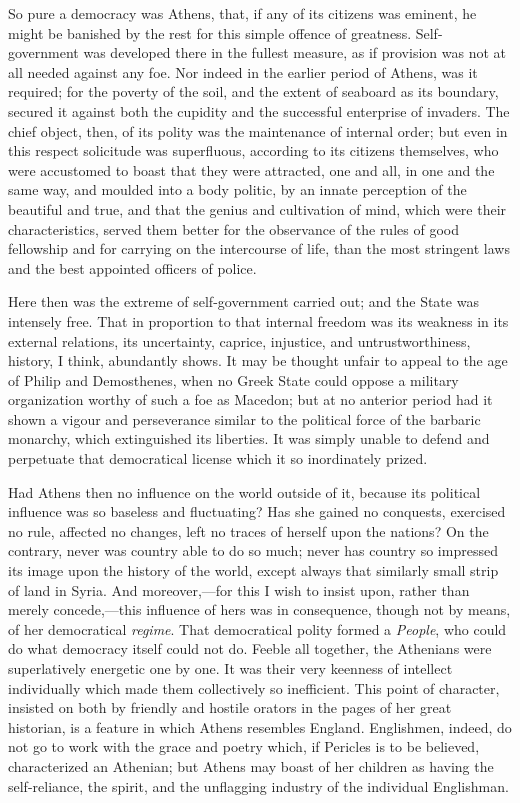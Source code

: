 So pure a democracy was Athens, that, if any of
its citizens was eminent, he might be banished by the rest for this
simple offence of greatness. Self-government was developed there in
the fullest measure, as if provision was not at all needed
against any foe. Nor indeed in the earlier period of Athens, was it
required; for the poverty of the soil, and the extent of seaboard as
its boundary, secured it against both the cupidity and the successful
enterprise of invaders. The chief object, then, of its polity was the
maintenance of internal order; but even in this respect solicitude was
superfluous, according to its citizens themselves, who were accustomed
to boast that they were attracted, one and all, in one and the same
way, and moulded into a body politic, by an innate perception of the
beautiful and true, and that the genius and cultivation of mind, which
were their characteristics, served them better for the observance of
the rules of good fellowship and for carrying on the intercourse of
life, than the most stringent laws and the best appointed officers of
police.

Here then was the extreme of self-government
carried out; and the State was intensely free. That in proportion to
that internal freedom was its weakness in its external relations, its
uncertainty, caprice, injustice, and untrustworthiness, history, I
think, abundantly shows. It may be thought unfair to appeal to the age
of Philip and Demosthenes, when no Greek State could oppose a military
organization worthy of such a foe as Macedon; but at no anterior
period had it shown a vigour and perseverance similar to the political
force of the barbaric monarchy, which extinguished its liberties. It
was simply unable to defend and perpetuate that democratical license
which it so inordinately prized.

Had Athens then no influence on the world outside
of it, because its political influence was so baseless and
fluctuating? Has she gained no conquests, exercised no rule, affected
no changes, left no traces of herself upon the nations? On the
contrary, never was country able to do so much; never has
country so impressed its image upon the history of the world, except
always that similarly small strip of land in Syria. And
moreover,—for this I wish to insist upon, rather than merely
concede,—this influence of hers was in consequence, though not by
means, of her democratical \emph{regime}. That democratical polity
formed a \emph{People}, who could do what democracy itself could not
do. Feeble all together, the Athenians were superlatively energetic
one by one. It was their very keenness of intellect individually which
made them collectively so inefficient. This point of character,
insisted on both by friendly and hostile orators in the pages of her
great historian, is a feature in which Athens resembles England.
Englishmen, indeed, do not go to work with the grace and poetry which,
if Pericles is to be believed, characterized an Athenian; but Athens
may boast of her children as having the self-reliance, the spirit, and
the unflagging industry of the individual Englishman.

